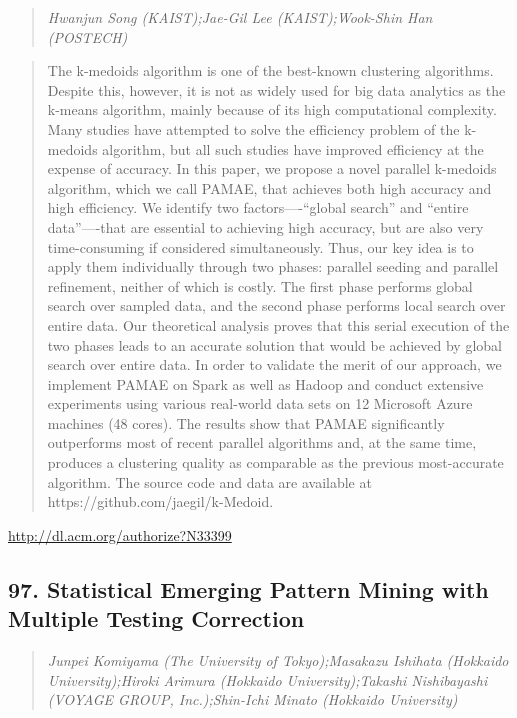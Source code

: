 \documentclass{article}
\begin{document}
\begin{quote}
\footnotesize{\textit{Hwanjun Song (KAIST);Jae-Gil Lee (KAIST);Wook-Shin Han (POSTECH)}}

\end{quote}

\begin{quote}
The k-medoids algorithm is one of the best-known clustering algorithms. Despite this, however, it is not as widely used for big data analytics as the k-means algorithm, mainly because of its high computational complexity. Many studies have attempted to solve the efficiency problem of the k-medoids algorithm, but all such studies have improved efficiency at the expense of accuracy. In this paper, we propose a novel parallel k-medoids algorithm, which we call PAMAE, that achieves both high accuracy and high efficiency. We identify two factors—-“global search” and “entire data”—-that are essential to achieving high accuracy, but are also very time-consuming if considered simultaneously. Thus, our key idea is to apply them individually through two phases: parallel seeding and parallel refinement, neither of which is costly. The first phase performs global search over sampled data, and the second phase performs local search over entire data. Our theoretical analysis proves that this serial execution of the two phases leads to an accurate solution that would be achieved by global search over entire data. In order to validate the merit of our approach, we implement PAMAE on Spark as well as Hadoop and conduct extensive experiments using various real-world data sets on 12 Microsoft Azure machines (48 cores). The results show that PAMAE significantly outperforms most of recent parallel algorithms and, at the same time, produces a clustering quality as comparable as the previous most-accurate algorithm. The source code and data are available at https://github.com/jaegil/k-Medoid.
\end{quote}

\href{http://dl.acm.org/authorize?N33399}{http://dl.acm.org/authorize?N33399}

\subsection{97. Statistical Emerging Pattern Mining with Multiple Testing Correction}

\begin{quote}
\footnotesize{\textit{Junpei Komiyama (The University of Tokyo);Masakazu Ishihata (Hokkaido University);Hiroki Arimura (Hokkaido University);Takashi Nishibayashi (VOYAGE GROUP, Inc.);Shin-Ichi Minato (Hokkaido University)}}

\end{quote}
\end{document}

